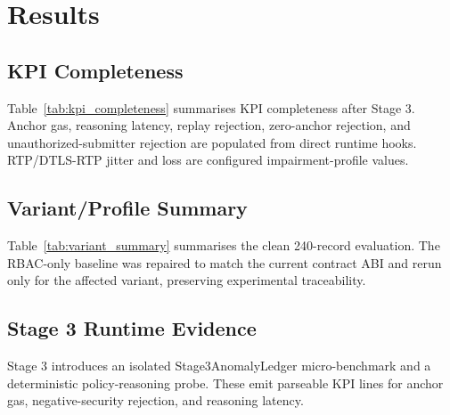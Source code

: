 \section{Results}
\subsection{KPI Completeness}
Table~\ref{tab:kpi_completeness} summarises KPI completeness after Stage 3. Anchor gas, reasoning latency, replay rejection, zero-anchor rejection, and unauthorized-submitter rejection are populated from direct runtime hooks. RTP/DTLS-RTP jitter and loss are configured impairment-profile values.



\subsection{Variant/Profile Summary}
Table~\ref{tab:variant_summary} summarises the clean 240-record evaluation. The RBAC-only baseline was repaired to match the current contract ABI and rerun only for the affected variant, preserving experimental traceability.



\subsection{Stage 3 Runtime Evidence}
Stage 3 introduces an isolated Stage3AnomalyLedger micro-benchmark and a deterministic policy-reasoning probe. These emit parseable KPI lines for anchor gas, negative-security rejection, and reasoning latency.





